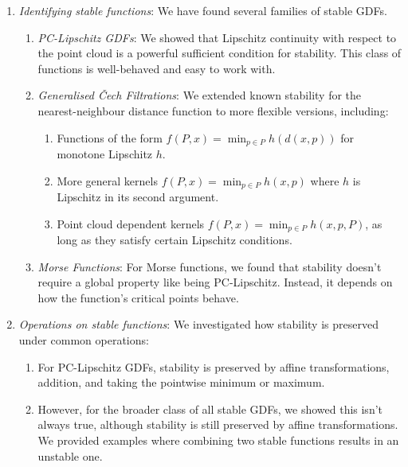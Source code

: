 \begin{enumerate}
    \item \emph{Identifying stable functions}: We have found several families of
    stable GDFs.
    \begin{enumerate}
        \item \emph{PC-Lipschitz GDFs}: We showed that Lipschitz continuity with
        respect to the point cloud is a powerful sufficient condition for
        stability. This class of functions is well-behaved and easy to work with.

        \item \emph{Generalised \v{C}ech Filtrations}: We extended known
        stability for the nearest-neighbour distance function to more flexible
        versions, including:
        \begin{enumerate}
            \item Functions of the form $f(P, x) = \min_{p \in P} h(d(x, p))$ for
            monotone Lipschitz $h$.
            \item More general kernels $f(P, x) = \min_{p \in P} h(x, p)$ where $h$
            is Lipschitz in its second argument.
            \item Point cloud dependent kernels $f(P, x) = \min_{p \in P} h(x, p,
            P)$, as long as they satisfy certain Lipschitz conditions.
        \end{enumerate}

        \item \emph{Morse Functions}: For Morse functions, we found that
        stability doesn't require a global property like being PC-Lipschitz.
        Instead, it depends on how the function's critical points behave.
    \end{enumerate}

    \item \emph{Operations on stable functions}: We investigated how stability
    is preserved under common operations:
    
    \begin{enumerate}
        \item For PC-Lipschitz GDFs, stability is preserved by affine transformations,
        addition, and taking the pointwise minimum or maximum.
        \item However, for the broader class of all stable GDFs, we showed this
        isn't always true, although stability is still preserved by affine
        transformations. We provided examples where combining two stable
        functions results in an unstable one.
    \end{enumerate}


\end{enumerate}
